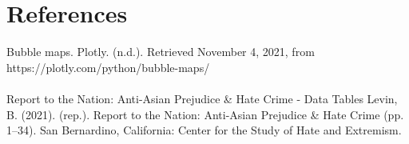 \documentclass[fontsize=11pt]{article}
\begin{document}
    \section*{References}
    Bubble maps. Plotly. (n.d.). Retrieved November 4, 2021, from https://plotly.com/python/bubble-maps/
    \\\\
    Report to the Nation: Anti-Asian Prejudice \& Hate Crime - Data Tables
    Levin, B. (2021). (rep.). Report to the Nation: Anti-Asian Prejudice \& Hate Crime (pp. 1–34). San Bernardino, California: Center for the Study of Hate and Extremism.
\end{document}
